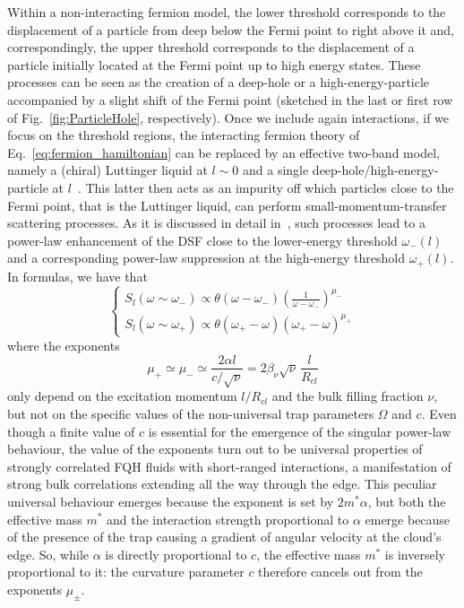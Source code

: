 \documentclass[twocolumn,pra,superscriptaddress,noshowpacs]{revtex4}
\begin{document}
Within a non-interacting fermion model, the lower threshold corresponds to the displacement of a particle from deep below the Fermi point to right above it and, correspondingly, the upper threshold corresponds to the displacement of a particle initially located at the Fermi point up to high energy states. These processes can be seen as the creation of a deep-hole or a high-energy-particle accompanied by a slight shift of the Fermi point (sketched in the last or first row of Fig.~\ref{fig:ParticleHole}, respectively).  
Once we include again interactions, if we focus on the threshold regions, the interacting fermion theory of Eq.~\eqref{eq:fermion_hamiltonian} can be replaced by an effective two-band model, namely a (chiral) Luttinger liquid at $l\sim0$ and a single deep-hole/high-energy-particle at $l$~\cite{Pustilnik_PRL_2006,Khodas_PRB_2007, ImambekovGlazman_RMP_2012}. This latter then acts as an impurity off which particles close to the Fermi point, that is the Luttinger liquid, can perform small-momentum-transfer scattering processes. As it is discussed in detail in~\cite{Pustilnik_PRL_2006}, such processes lead to a power-law enhancement of the DSF close to the lower-energy threshold $\omega_-(l)$ and a corresponding power-law suppression at the high-energy threshold $\omega_+(l)$.
In formulas, we have that
\begin{equation}
    \begin{cases}
        S_l(\omega\sim\omega_-) \propto \theta(\omega-\omega_-)\left(\frac{1}{\omega-\omega_-}\right)^{\mu_-}\\
        S_l(\omega\sim\omega_+) \propto \theta(\omega_+-\omega)\left(\omega_+-\omega\right)^{\mu_+}
    \end{cases}
\end{equation}
where the exponents
\begin{equation}
    \label{eq:exponentDSF}
    \mu_+\simeq\mu_-\simeq \frac{2\alpha l}{c/\sqrt{\nu}} = 2\beta_\nu\sqrt{\nu}\,\frac{l}{R_{cl}}
\end{equation}
only depend on the excitation momentum $l/R_{cl}$ and the bulk filling fraction $\nu$, 
but not on the specific values of the non-universal trap parameters $\Omega$ and $c$. 
Even though a finite value of $c$ is essential for the emergence of the singular power-law behaviour, the value of the exponents turn out to be universal properties of strongly correlated FQH fluids with short-ranged interactions, a manifestation of strong bulk correlations extending all the way through the edge.
This peculiar universal behaviour emerges because the exponent is set by $2m^*\alpha$, but both the effective mass $m^*$ and the interaction strength proportional to $\alpha$ emerge because of the presence of the trap causing a gradient of angular velocity at the cloud's edge. So, while $\alpha$ is directly proportional to $c$, the effective mass $m^*$ is inversely proportional to it: the curvature parameter $c$ therefore cancels out from the exponents $\mu_\pm$.
\end{document}
